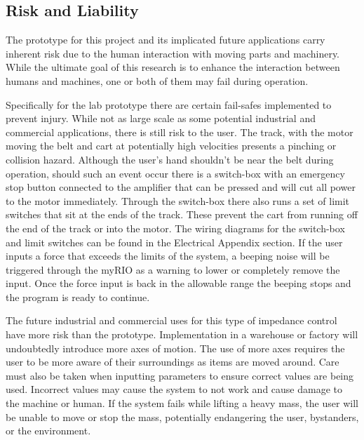 \subsection*{Risk and Liability}
The prototype for this project and its implicated future applications carry inherent risk due to the human interaction with moving parts and machinery. While the ultimate goal of this research is to enhance the interaction between humans and machines, one or both of them may fail during operation.

Specifically for the lab prototype there are certain fail-safes implemented to prevent injury. While not as large scale as some potential industrial and commercial applications, there is still risk to the user. The track, with the motor moving the belt and cart at potentially high velocities presents a pinching or collision hazard. Although the user's hand shouldn't be near the belt during operation, should such an event occur there is a switch-box with an emergency stop button connected to the amplifier that can be pressed and will cut all power to the motor immediately. Through the switch-box there also runs a set of limit switches that sit at the ends of the track. These prevent the cart from running off the end of the track or into the motor. The wiring diagrams for the switch-box and limit switches can be found in the Electrical Appendix section. If the user inputs a force that exceeds the limits of the system, a beeping noise will be triggered through the myRIO as a warning to lower or completely remove the input. Once the force input is back in the allowable range the beeping stops and the program is ready to continue.

The future industrial and commercial uses for this type of impedance control have more risk than the prototype. Implementation in a warehouse or factory will undoubtedly introduce more axes of motion. The use of more axes requires the user to be more aware of their surroundings as items are moved around. Care must also be taken when inputting parameters to ensure correct values are being used. Incorrect values may cause the system to not work and cause damage to the machine or human. If the system fails while lifting a heavy mass, the user will be unable to move or stop the mass, potentially endangering the user, bystanders, or the environment.
